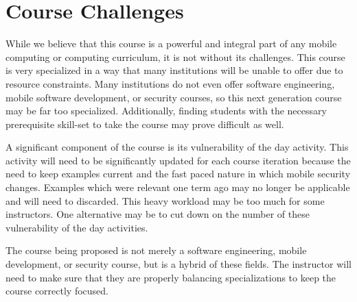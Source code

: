 \documentclass[conference]{IEEEtran}
\newcommand{\dan}[1]{\textcolor{blue}{{\it [Dan says: #1]}}}
\begin{document}
\section{Course Challenges}
\label{sec: coursechallenges}


While we believe that this course is a powerful and integral part of any mobile computing or computing curriculum, it is not without its challenges. This course is very specialized in a way that many institutions will be unable to offer due to resource constraints. Many institutions do not even offer software engineering, mobile software development, or security courses, so this next generation course may be far too specialized. Additionally, finding students with the necessary prerequisite skill-set to take the course may prove difficult as well.

A significant component of the course is its vulnerability of the day activity. This activity will need to be significantly updated for each course iteration because the need to keep examples current and the fast paced nature in which mobile security changes. Examples which were relevant one term ago may no longer be applicable and will need to discarded. This heavy workload may be too much for some instructors. One alternative may be to cut down on the number of these vulnerability of the day activities.

The course being proposed is not merely a software engineering, mobile development, or security course, but is a hybrid of these fields. The instructor will need to make sure that they are properly balancing specializations to keep the course correctly focused.







\end{document}
